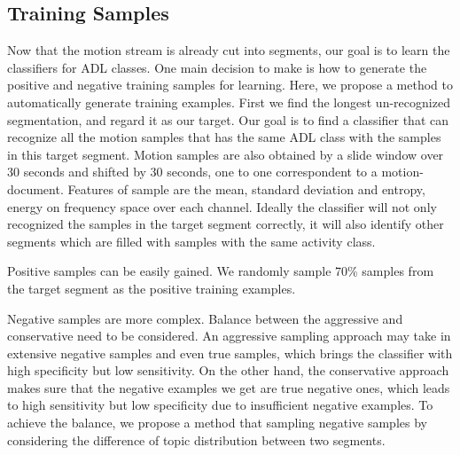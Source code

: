 \documentclass{sigchi}
\begin{document}
    \subsection{Training Samples}
    Now that the motion stream is already cut into segments, our goal is to learn the classifiers for ADL classes.
    One main decision to make is how to generate the positive and negative training samples for learning.
    Here, we propose a method to automatically generate training examples.
    First we find the longest un-recognized segmentation, and regard it as our target.
    Our goal is to find a classifier that can recognize all the motion samples that has the same ADL class with the samples in this target segment.
    Motion samples are also obtained by a slide window over 30 seconds and shifted by 30 seconds, one to one correspondent to a motion-document.
    Features of sample are the mean, standard deviation and entropy, energy on frequency space \cite{rai2012mining} over each channel.
    Ideally the classifier will not only recognized the samples in the target segment correctly,
    it will also identify other segments which are filled with samples with the same activity class.

    Positive samples can be easily gained.
    We randomly sample 70\% samples from the target segment as the positive training examples.

    Negative samples are more complex.
    Balance between the aggressive and conservative need to be considered.
    An aggressive sampling approach may take in extensive negative samples and even true samples, which brings the classifier with high specificity but low sensitivity.
    On the other hand, the conservative approach makes sure that the negative examples we get are true negative ones, which leads to high sensitivity but low specificity due to insufficient negative examples.
    To achieve the balance, we propose a method that sampling negative samples by considering the difference of topic distribution between two segments.
\end{document}

